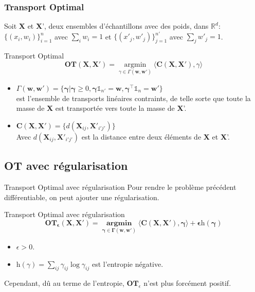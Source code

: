 \documentclass{beamer}
\begin{document}
\begin{frame}
    \frametitle{Transport Optimal}
    Soit \textbf{X} et \textbf{X}', deux ensembles d'échantillons avec des poids, dans $\mathbb{R}^{d}$:
    $\{ (x_i, w_i) \}^{n}_{i = 1}$ avec $\sum_i w_i = 1$ et $\{ (x'_j, w'_j) \}^{n'}_{j = 1}$ avec $\sum_j w'_j = 1$.
    \begin{block}{Transport Optimal}
        $$\textbf{OT}(\textbf{X}, \textbf{X}') = \underset{\gamma \in \Gamma(\textbf{w}, \textbf{w}')}{\operatorname{\arg \min}} \langle \textbf{C}(\textbf{X}, \textbf{X}'), \gamma \rangle$$
    \end{block}
    \begin{itemize}
        \item $\Gamma(\textbf{w}, \textbf{w}') = \{ \mathbf{\gamma} | \mathbf{\gamma} \geq 0, \mathbf{\gamma} \mathds{1}_{n'} = \textbf{w}, \mathbf{\gamma}^{\top} \mathds{1}_{n} = \textbf{w}'\}$\\
        est l'ensemble de transports linéaires contraints, de telle sorte que toute la masse de \textbf{X} est transportée vers toute la masse de \textbf{X}'.
        \item $\textbf{C}(\textbf{X}, \textbf{X}') = \{d(\textbf{X}_{ij}, \textbf{X}'_{i'j'})\}$\\
        Avec $d(\textbf{X}_{ij}, \textbf{X}'_{i'j'})$ est la distance entre deux éléments de \textbf{X} et \textbf{X}'.
    \end{itemize}
\end{frame}


\subsection{OT avec régularisation}

\begin{frame}{Transport Optimal avec régularisation}
    Pour rendre le problème précédent différentiable, on peut ajouter une régularisation.
    \begin{block}{Transport Optimal avec régularisation}
        $$\mathbf{OT_{\epsilon}(\textbf{X}, \textbf{X}') = \underset{\gamma \in \Gamma(\textbf{w}, \textbf{w}')}{\operatorname{\arg \min}} \langle \textbf{C}(\textbf{X}, \textbf{X}'), \gamma \rangle + \epsilon \textit{h}(\gamma)}$$
    \end{block}
    \begin{itemize}
        \item $\epsilon > 0$.
        \item $\textit{h}(\gamma) = \sum_{ij}\gamma_{ij} \log \gamma_{ij}$ est l'entropie négative.
    \end{itemize}
    Cependant, dû au terme de l'entropie, $\textbf{OT}_{\epsilon}$ n'est plus forcément positif. 
\end{frame}
\end{document}
